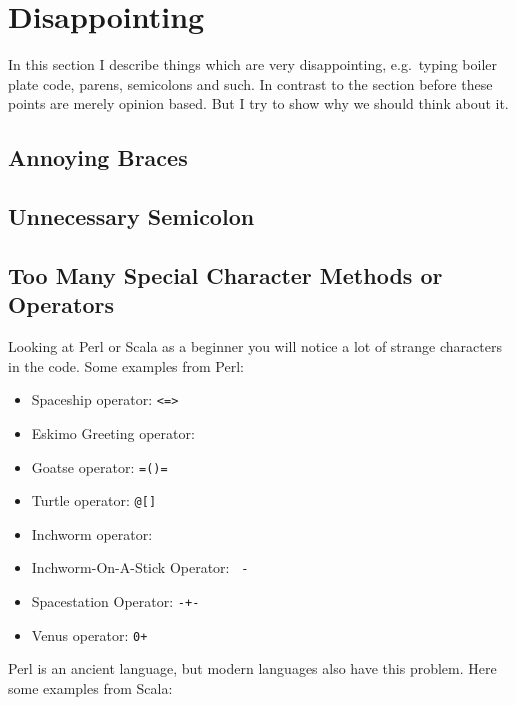 \documentclass[12pt,a4paper]{report}
\begin{document}

\section{Disappointing}

In this section I describe things which are very disappointing, e.g.\ typing boiler plate code, parens, semicolons and such. In contrast to the section before these points are merely opinion based. But I try to show why we should think about it.

\subsection{Annoying Braces}


\subsection{Unnecessary Semicolon}


\subsection{Too Many Special Character Methods or Operators}

Looking at Perl or Scala as a beginner you will notice a lot of strange characters in the code. Some examples from Perl\cite{secret-perl-operators}:

\begin{itemize}
    \item Spaceship operator: \texttt{<=>}
    \item Eskimo Greeting operator: \texttt{}{}
    \item Goatse operator: \texttt{=()=}
    \item Turtle operator: \texttt{@{[]}}
    \item Inchworm operator: \texttt{~~}
    \item Inchworm-On-A-Stick Operator: \texttt{~-}
    \item Spacestation Operator: \texttt{-+-}
    \item Venus operator: \texttt{0+}
\end{itemize}

Perl is an ancient language, but modern languages also have this problem. Here some examples from Scala\cite{special-operators-scala}:
\end{document}
